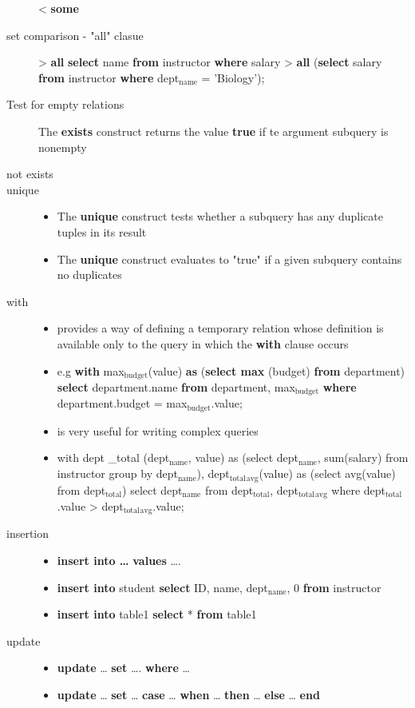 \documentclass[11pt]{article}
\begin{document}
\begin{description}
        < \textbf{some}
\item[{set comparison - "all" clasue}] > \textbf{all}
\textbf{select} name
\textbf{from} instructor
\textbf{where} salary > \textbf{all} (\textbf{select} salary
                    \textbf{from} instructor
                    \textbf{where} dept$_{\text{name}}$ = 'Biology');
\item[{Test for empty relations}] The \textbf{exists} construct returns the value \textbf{true} if te argument subquery
is nonempty
\item[{not exists}] 
\item[{unique}] \begin{itemize}
\item The \textbf{unique} construct tests whether a subquery has any duplicate tuples
in its result
\item The \textbf{unique} construct evaluates to "true" if a given subquery contains no duplicates
\end{itemize}
\item[{with}] \begin{itemize}
\item provides a way of defining a temporary relation whose definition is available only to
the query in which the \textbf{with} clause occurs
\item e.g
\textbf{with} max$_{\text{budget}}$(value) \textbf{as}
    (\textbf{select max} (budget)
    \textbf{from} department)
\textbf{select} department.name
\textbf{from} department, max$_{\text{budget}}$
\textbf{where} department.budget = max$_{\text{budget}}$.value;
\item is very useful for writing complex queries
\item with dept \_total (dept$_{\text{name}}$, value) as
   (select dept$_{\text{name}}$, sum(salary)
    from instructor
    group by dept$_{\text{name}}$),
dept$_{\text{total}}$$_{\text{avg}}$(value) as
   (select avg(value)
    from dept$_{\text{total}}$)
select dept$_{\text{name}}$
from dept$_{\text{total}}$, dept$_{\text{total}}$$_{\text{avg}}$
where dept$_{\text{total}}$.value > dept$_{\text{total}}$$_{\text{avg}}$.value;
\end{itemize}
\item[{insertion}] \begin{itemize}
\item \textbf{insert into \ldots{}} \textbf{values} \ldots{}.
\item \textbf{insert into} student
\textbf{select} ID, name, dept$_{\text{name}}$, 0
\textbf{from} instructor
\item \textbf{insert into} table1 \textbf{select} * \textbf{from} table1
\end{itemize}
\item[{update}] \begin{itemize}
\item \textbf{update} \ldots{} \textbf{set} \ldots{}. \textbf{where} \ldots{}
\item \textbf{update} \ldots{} \textbf{set} \ldots{} \textbf{case} \ldots{}
\textbf{when} \ldots{} \textbf{then} \ldots{}
\textbf{else} \ldots{}
\textbf{end}
\end{itemize}
\end{description}
\end{document}
